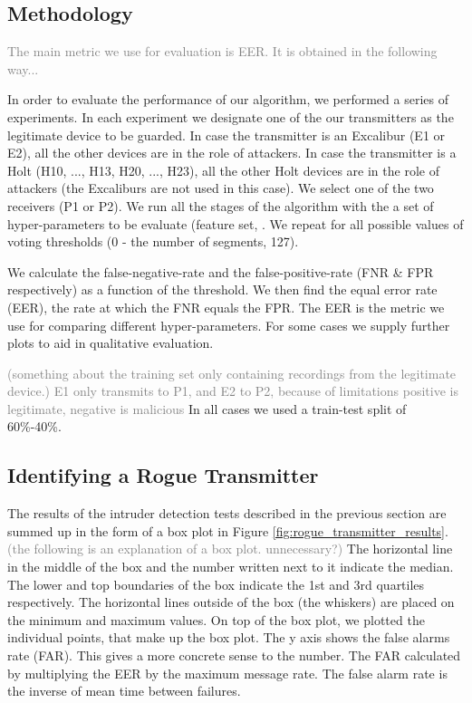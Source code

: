 \documentclass[conference]{IEEEtran}
\begin{document}
\subsection{Methodology}
  \textcolor{gray}{The main metric we use for evaluation is EER. It is obtained in the following way...}
  
  In order to evaluate the performance of our algorithm, we performed a series of experiments. In each experiment we designate one of the our transmitters as the legitimate device to be guarded. In case the transmitter is an Excalibur (E1 or E2), all the other devices are in the role of attackers. In case the transmitter is a Holt (H10, ..., H13, H20, ..., H23), all the other Holt devices are in the role of attackers (the Excaliburs are not used in this case). We select one of the two receivers (P1 or P2). We run all the stages of the algorithm with the a set of hyper-parameters to be evaluate (feature set, . We repeat for all possible values of voting thresholds (0 - the number of segments, 127).
  
  We calculate the false-negative-rate and the false-positive-rate (FNR \& FPR respectively) as a function of the threshold. We then find the equal error rate (EER), the rate at which the FNR equals the FPR. The EER is the metric we use for comparing different hyper-parameters. For some cases we supply further plots to aid in qualitative evaluation.
  
  \textcolor{gray}{(something about the training set only containing recordings from the legitimate device.)}
  \textcolor{gray}{E1 only transmits to P1, and E2 to P2, because of limitations}
  \textcolor{gray}{positive is legitimate, negative is malicious}
  In all cases we used a train-test split of 60\%-40\%.
  
\subsection{Identifying a Rogue Transmitter}
  The results of the intruder detection tests described in the previous section are summed up in the form of a box plot in Figure \ref{fig:rogue_transmitter_results}. \textcolor{gray}{(the following is an explanation of a box plot. unnecessary?)} The horizontal line in the middle of the box and the number written next to it indicate the median. The lower and top boundaries of the box indicate the 1st and 3rd quartiles respectively. The horizontal lines outside of the box (the whiskers) are placed on the minimum and maximum values. On top of the box plot, we plotted the individual points, that make up the box plot.
  The y axis shows the false alarms rate (FAR). This gives a more concrete sense to the number. The FAR calculated by multiplying the EER by the maximum message rate. The false alarm rate is the inverse of mean time between failures.
  
\end{document}
